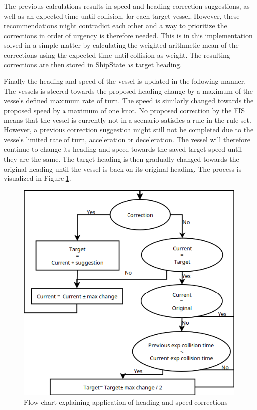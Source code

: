The previous calculations results in speed and heading correction suggestions, as well as an expected time until collision, for each target vessel. However, these recommendations might contradict each other and a way to prioritize the corrections in order of urgency is therefore needed. This is in this implementation solved in a simple matter by calculating the weighted arithmetic mean of the corrections using the expected time until collision as weight. The resulting corrections are then stored in ShipState as target heading.

Finally the heading and speed of the vessel is updated in the following manner. The vessels is steered towards the proposed heading change by a maximum of the vessels defined maximum rate of turn. The speed is similarly changed towards the proposed speed by a maximum of one knot. No proposed correction by the FIS means that the vessel is currently not in a scenario satisfies a rule in the rule set. However, a previous correction suggestion might still not be completed due to the vessels limited rate of turn, acceleration or deceleration.  The vessel will therefore continue to change its heading and speed towards the saved target speed until they are the same.  The target heading is then gradually changed towards the original heading until the vessel is back on its original heading. The process is visualized in Figure \ref{fig:flow_chart}.
\begin{figure}[H]
    \centering
    \includegraphics[width=\textwidth,height=0.75\textheight,keepaspectratio]{Figures/flow.png}
    \caption{Flow chart explaining application of heading and speed corrections}
    \label{fig:flow_chart}
\end{figure}

